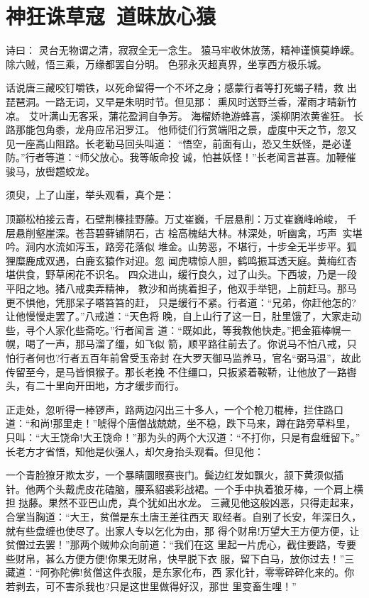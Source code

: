 \chapter{神狂诛草寇~道昧放心猿}

诗曰：
灵台无物谓之清，寂寂全无一念生。
猿马牢收休放荡，精神谨慎莫峥嵘。
除六贼，悟三乘，万缘都罢自分明。
色邪永灭超真界，坐享西方极乐城。

话说唐三藏咬钉嚼铁，以死命留得一个不坏之身；感蒙行者等打死蝎子精，救
出琵琶洞。一路无词，又早是朱明时节。但见那：
熏风时送野兰香，濯雨才晴新竹凉。
艾叶满山无客采，蒲花盈涧自争芳。
海榴娇艳游蜂喜，溪柳阴浓黄雀狂。
长路那能包角黍，龙舟应吊汨罗江。
他师徒们行赏端阳之景，虚度中天之节，忽又见一座高山阻路。长老勒马回头叫道：
“悟空，前面有山，恐又生妖怪，是必谨防。”行者等道：“师父放心。我等皈命投
诚，怕甚妖怪！”长老闻言甚喜。加鞭催骏马，放辔趱蛟龙。

须臾，上了山崖，举头观看，真个是：

顶巅松柏接云青，石壁荆榛挂野藤。万丈崔巍，千层悬削：万丈崔巍峰岭峻，
千层悬削壑崖深。苍苔碧藓铺阴石，古
桧高槐结大林。林深处，听幽禽，巧声实堪吟。涧内水流如泻玉，路旁花落似
堆金。山势恶，不堪行，十步全无半步平。狐狸糜鹿成双遇，白鹿玄猿作对迎。忽
闻虎啸惊人胆，鹤鸣振耳透天庭。黄梅红杏堪供食，野草闲花不识名。
四众进山，缓行良久，过了山头。下西坡，乃是一段平阳之地。猪八戒卖弄精神，
教沙和尚挑着担子，他双手举钯，上前赶马。那马更不惧他，凭那呆子嗒笞笞的赶，
只是缓行不紧。行者道：“兄弟，你赶他怎的?让他慢慢走罢了。”八戒道：“天色将
晚，自上山行了这一日，肚里饿了，大家走动些，寻个人家化些斋吃。”行者闻言
道：“既如此，等我教他快走。”把金箍棒幌一幌，喝了一声，那马溜了缰，如飞似
箭，顺平路往前去了。你说马不怕八戒，只怕行者何也?行者五百年前曾受玉帝封
在大罗天御马监养马，官名“弼马温”，故此传留至今，是马皆惧猴子。那长老挽
不住缰口，只扳紧着鞍鞒，让他放了一路辔头，有二十里向开田地，方才缓步而行。

正走处，忽听得一棒锣声，路两边闪出三十多人，一个个枪刀棍棒，拦住路口
道：“和尚!那里走！”唬得个唐僧战兢兢，坐不稳，跌下马来，蹲在路旁草料里，
只叫：“大王饶命!大王饶命！”那为头的两个大汉道：“不打你，只是有盘缠留下。”
长老方才省悟，知他是伙强人，却欠身抬头观看。但见他：

一个青脸獠牙欺太岁，一个暴睛圜眼赛丧门。鬓边红发如飘火，颔下黄须似插
针。他两个头戴虎皮花磕脑，腰系貂裘彩战裙。一个手中执着狼牙棒，一个肩上横
担挞藤。果然不亚巴山虎，真个犹如出水龙。
三藏见他这般凶恶，只得走起来，合掌当胸道：“大王，贫僧是东土唐王差往西天
取经者。自别了长安，年深日久，就有些盘缠也使尽了。出家人专以乞化为由，那
得个财帛!万望大王方便方便，让贫僧过去罢！”那两个贼帅众向前道：“我们在这
里起一片虎心，截住要路，专要些财帛，甚么方便方便!你果无财帛，快早脱下衣
服，留下白马，放你过去！”三藏道：“阿弥陀佛!贫僧这件衣服，是东家化布，西
家化针，零零碎碎化来的。你若剥去，可不害杀我也?只是这世里做得好汉，那世
里变畜生哩！”

